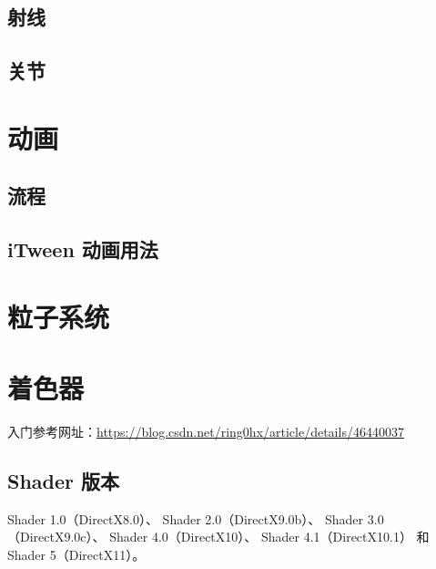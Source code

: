 \documentclass[UTF8,a4paper,12pt]{ctexbook}
\begin{document}
	
	\section{射线}
	
	
	\section{关节}
		
\chapter{动画}
	\section{流程}
		
		
	
	\section{iTween 动画用法}
		

\chapter{粒子系统}

		
\chapter{着色器}
	入门参考网址：\url{https://blog.csdn.net/ring0hx/article/details/46440037}
	
	\section{Shader 版本}
		Shader 1.0（DirectX8.0）、
		Shader 2.0（DirectX9.0b）、
		Shader 3.0（DirectX9.0c）、
		Shader 4.0（DirectX10）、
		Shader 4.1（DirectX10.1）
		和Shader 5（DirectX11）。
\end{document}
